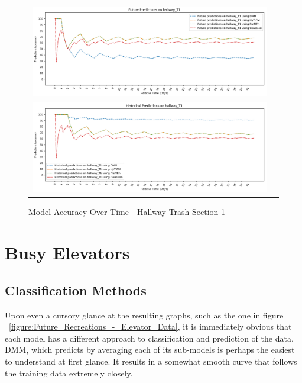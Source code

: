 \begin{center}
\begin{figure}[!Hp]
  \begin{tabular}{cc}
    {\includegraphics[width = 6in]{images/results/Future_Predictions_on_hallway_T1.png}} \\
    {\includegraphics[width = 6in]{images/results/Historical_Predictions_on_hallway_T1.png}} \\
  \end{tabular}
  \caption{Model Accuracy Over Time - Hallway Trash Section 1}
\end{figure}
\end{center}




\section{ Busy Elevators }

\subsection{ Classification Methods }

Upon even a cursory glance at the resulting graphs, such as the one in figure
~\ref{figure:Future_Recreations_-_Elevator_Data}, it is immediately
obvious that each model has a different approach to classification and
prediction of the data. DMM, which predicts by
averaging each of its sub-models is perhaps the easiest to understand at first
glance. It results in a somewhat smooth curve that follows the training data
extremely closely. \\

